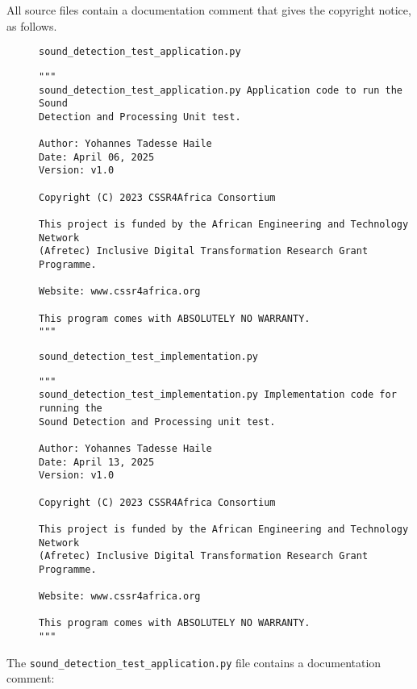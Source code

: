 \documentclass{CSSRforAfrica}
\newcommand{\blank}{~\\}
\newcommand{\checkboxChecked}{\fbox{\ding{51}}} %
\begin{document}
\noindent All source files contain a documentation comment that gives the copyright notice, as follows.
 
\begin{description}

\item[\checkboxChecked] {\small \verb+sound_detection_test_application.py+}  
{\small \begin{verbatim}
"""
sound_detection_test_application.py Application code to run the Sound 
Detection and Processing Unit test.

Author: Yohannes Tadesse Haile
Date: April 06, 2025
Version: v1.0

Copyright (C) 2023 CSSR4Africa Consortium

This project is funded by the African Engineering and Technology Network 
(Afretec) Inclusive Digital Transformation Research Grant Programme.

Website: www.cssr4africa.org

This program comes with ABSOLUTELY NO WARRANTY.
"""
\end{verbatim} }

\item[\checkboxChecked]  {\small \verb+sound_detection_test_implementation.py+}  
{\small \begin{verbatim}
"""
sound_detection_test_implementation.py Implementation code for running the 
Sound Detection and Processing unit test.

Author: Yohannes Tadesse Haile
Date: April 13, 2025
Version: v1.0

Copyright (C) 2023 CSSR4Africa Consortium

This project is funded by the African Engineering and Technology Network 
(Afretec) Inclusive Digital Transformation Research Grant Programme.

Website: www.cssr4africa.org

This program comes with ABSOLUTELY NO WARRANTY.
"""
\end{verbatim} }

\end{description} 

\newpage
\noindent The {\small \verb+sound_detection_test_application.py+} file contains a documentation comment:
\end{document}
